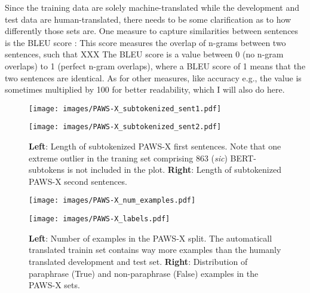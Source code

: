 Since the training data are solely machine-translated while the development and test data are
human-translated, there needs to be some clarification as to how differently those sets are.
One measure to capture similarities between sentences is the BLEU score \cite{papineni2002bleu}:
This score measures the overlap of n-grams between two sentences, such that XXX
The BLEU score is a value between 0 (no n-gram overlaps) to 1 (perfect n-gram overlaps), where a
BLEU score of 1 means that the two sentences are identical. As for other measures, like accuracy
e.g., the value is sometimes multiplied by 100 for better readability, which I will also do here.


\begin{figure}
  \label{fig:pawsx-stat}
  \begin{minipage}{0.45\linewidth}
  \vspace{0pt}
    \texttt{[image: images/PAWS-X\_subtokenized\_sent1.pdf]}
  \end{minipage}
  \hfill
  \begin{minipage}{0.45\linewidth}
  \vspace{0pt}
    \texttt{[image: images/PAWS-X\_subtokenized\_sent2.pdf]}
  \end{minipage}
  \caption[PAWS-X Lengths]{\textbf{Left}: Length of subtokenized PAWS-X first sentences. Note that one extreme outlier in the
                           traning set comprising 863 (\textit{sic}) BERT-subtokens is not included in the plot.
                           \textbf{Right}: Length of subtokenized PAWS-X second sentences.}
\end{figure}


\begin{figure}
  \label{fig:pawsx-stat}
  \begin{minipage}{0.45\linewidth}
  \vspace{0pt}
    \texttt{[image: images/PAWS-X\_num\_examples.pdf]}
  \end{minipage}
  \hfill
  \begin{minipage}{0.45\linewidth}
  \vspace{0pt}
    \texttt{[image: images/PAWS-X\_labels.pdf]}
  \end{minipage}
  \caption[PAWS-X Set Size/Labels]{\textbf{Left}: Number of examples in the PAWS-X split. The automaticall translated
                           trainin set contains way more examples than the humanly translated development and test set.
                           \textbf{Right}: Distribution of paraphrase (True) and non-paraphrase (False) examples in the
                           PAWS-X sets.}
\end{figure}


